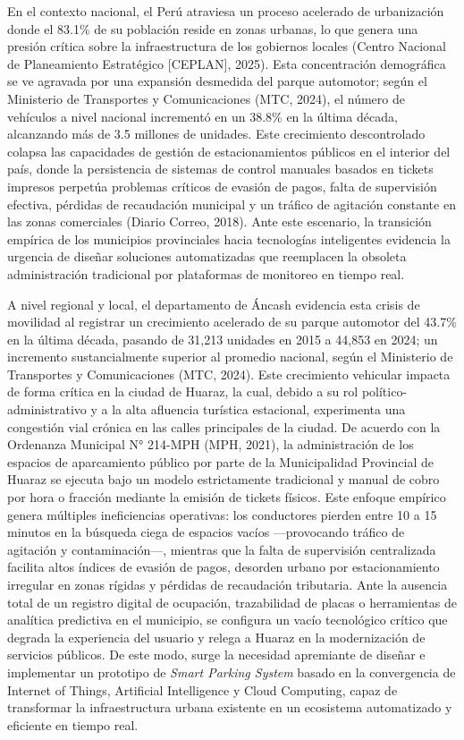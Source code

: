 \documentclass[12pt,a4paper]{article}
\begin{document}
En el contexto nacional, el Perú atraviesa un proceso acelerado de urbanización donde el 83.1\% de su población reside en zonas urbanas, lo que genera una presión crítica sobre la infraestructura de los gobiernos locales (Centro Nacional de Planeamiento Estratégico [CEPLAN], 2025). Esta concentración demográfica se ve agravada por una expansión desmedida del parque automotor; según el Ministerio de Transportes y Comunicaciones (MTC, 2024), el número de vehículos a nivel nacional incrementó en un 38.8\% en la última década, alcanzando más de 3.5 millones de unidades. Este crecimiento descontrolado colapsa las capacidades de gestión de estacionamientos públicos en el interior del país, donde la persistencia de sistemas de control manuales basados en tickets impresos perpetúa problemas críticos de evasión de pagos, falta de supervisión efectiva, pérdidas de recaudación municipal y un tráfico de agitación constante en las zonas comerciales (Diario Correo, 2018). Ante este escenario, la transición empírica de los municipios provinciales hacia tecnologías inteligentes evidencia la urgencia de diseñar soluciones automatizadas que reemplacen la obsoleta administración tradicional por plataformas de monitoreo en tiempo real.

A nivel regional y local, el departamento de Áncash evidencia esta crisis de movilidad al registrar un crecimiento acelerado de su parque automotor del 43.7\% en la última década, pasando de 31,213 unidades en 2015 a 44,853 en 2024; un incremento sustancialmente superior al promedio nacional, según el Ministerio de Transportes y Comunicaciones (MTC, 2024). Este crecimiento vehicular impacta de forma crítica en la ciudad de Huaraz, la cual, debido a su rol político-administrativo y a la alta afluencia turística estacional, experimenta una congestión vial crónica en las calles principales de la ciudad. De acuerdo con la Ordenanza Municipal N° 214-MPH (MPH, 2021), la administración de los espacios de aparcamiento público por parte de la Municipalidad Provincial de Huaraz se ejecuta bajo un modelo estrictamente tradicional y manual de cobro por hora o fracción mediante la emisión de tickets físicos. Este enfoque empírico genera múltiples ineficiencias operativas: los conductores pierden entre 10 a 15 minutos en la búsqueda ciega de espacios vacíos —provocando tráfico de agitación y contaminación—, mientras que la falta de supervisión centralizada facilita altos índices de evasión de pagos, desorden urbano por estacionamiento irregular en zonas rígidas y pérdidas de recaudación tributaria. Ante la ausencia total de un registro digital de ocupación, trazabilidad de placas o herramientas de analítica predictiva en el municipio, se configura un vacío tecnológico crítico que degrada la experiencia del usuario y relega a Huaraz en la modernización de servicios públicos. De este modo, surge la necesidad apremiante de diseñar e implementar un prototipo de \textit{Smart Parking System} basado en la convergencia de Internet of Things, Artificial Intelligence y Cloud Computing, capaz de transformar la infraestructura urbana existente en un ecosistema automatizado y eficiente en tiempo real.
\end{document}
